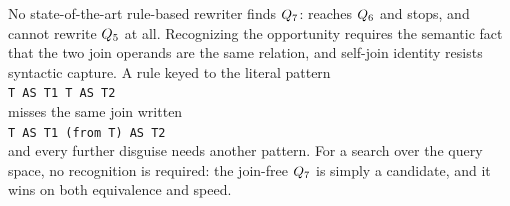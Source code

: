 No state-of-the-art rule-based rewriter finds $Q_7$:
\learnedrewrite reaches $Q_6$ and stops, and \wetune cannot
rewrite $Q_5$ at all. Recognizing the opportunity requires the
semantic fact that the two join operands are the same relation, and
self-join identity resists syntactic capture. A rule keyed to the
literal pattern\\
\texttt{\sqlfromcolor T AS T1 \sqljoincolor T AS T2}\\
misses the same join written\\
\texttt{\sqlfromcolor T AS T1 \sqljoincolor (\sqlselectcolor * from T) AS T2} \\
and every further disguise needs another pattern. For a search over
the query space, no recognition is required: the join-free $Q_7$
is simply a candidate, and it wins on both equivalence and speed.




